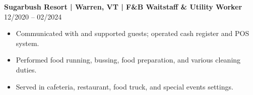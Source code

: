 \noindent
\textbf{Sugarbush Resort | Warren, VT | F\&B Waitstaff \& Utility Worker} \hfill 12/2020 -- 02/2024
\begin{itemize}
    \item Communicated with and supported guests; operated cash register and POS system.
    \item Performed food running, bussing, food preparation, and various cleaning duties.
    \item Served in cafeteria, restaurant, food truck, and special events settings.
\end{itemize}
